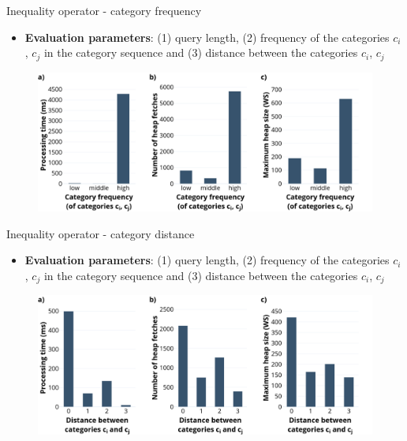 \documentclass[18pt]{beamer}
\begin{document}
\begin{frame}[noframenumbering]{Inequality operator - category frequency}

	\begin{itemize}
		\item \textbf{Evaluation parameters}: (1) query length, (2) frequency of the categories $c_i$, $c_j$ in the category sequence and (3) distance between the categories $c_i$, $c_j$
	\end{itemize}
	
	\begin{figure}[h]
		\includegraphics[scale=0.275]{neo_frequency.png}
	\end{figure}

\end{frame}

\begin{frame}[noframenumbering]{Inequality operator - category distance}

	\begin{itemize}
		\item \textbf{Evaluation parameters}: (1) query length, (2) frequency of the categories $c_i$, $c_j$ in the category sequence and (3) distance between the categories $c_i$, $c_j$
	\end{itemize}
	
	\begin{figure}[h]
		\includegraphics[scale=0.275]{neo_distance.png}
	\end{figure}

\end{frame}
\end{document}
